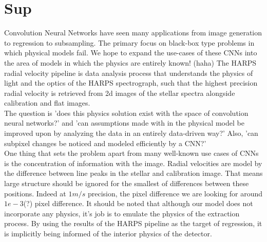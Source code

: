 \documentclass[12pt]{article}
\begin{document}
\section*{Sup}

Convolution Neural Networks have seen many applications from image generation to regression to subsampling. The primary focus on black-box type problems in which physical models fail. We hope to expand the use-cases of these CNNs into the area of models in which the physics are entirely known! (haha) The HARPS radial velocity pipeline is data analysis process that understands the physics of light and the optics of the HARPS spectrograph, such that the highest precision radial velocity is retrieved from 2d images of the stellar spectra alongside calibration and flat images. \\
The question is 'does this physics solution exist with the space of convolution neural networks?' and 'can assumptions made with in the physical model be improved upon by analyzing the data in an entirely data-driven way?' Also, 'can subpixel changes be noticed and modeled efficiently by a CNN?' \\
One thing that sets the problem apart from many well-known use cases of CNNs is the concentration of information with the image. Radial velocities are model by the difference between line peaks in the stellar and calibration image. That means large structure should be ignored for the smallest of differences between these positions. Indeed at $1 m/s$ precision, the pixel difference we are looking for around $1e-3$(?) pixel difference. It should be noted that although our model does not incorporate any physics, it's job is to emulate the physics of the extraction process. By using the results of the HARPS pipeline as the target of regression, it is implicitly being informed of the interior physics of the detector.
\end{document}
